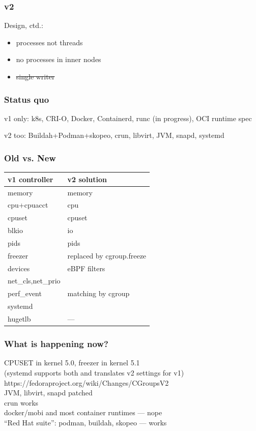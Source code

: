 \documentclass[serif]{beamer}
\begin{document}
\begin{frame}
  \frametitle{v2}

  Design, ctd.:
  \begin{itemize}
  \item processes not threads
  \item no processes in inner nodes
  \item \sout{single writer}
  \end{itemize}
\end{frame}

\begin{frame}
  \frametitle{Status quo}
  
  v1 only: k8s, CRI-O, Docker, Containerd, runc (in progress), OCI runtime spec

  \medskip

  v2 too: Buildah+Podman+skopeo, crun, libvirt, JVM, snapd, systemd
\end{frame}

\begin{frame}[fragile]
  \frametitle{Old vs. New}

  \begin{tabular}{l|l}
    v1 controller          &  v2 solution\\
    \hline
    memory                 &  memory \\
    cpu+cpuacct            &  cpu    \\
    cpuset                 &  cpuset \\
    blkio                  &  io     \\
    pids                   &  pids   \\[1em]\pause
    freezer                &  replaced by cgroup.freeze\\[1em]\pause
    devices                &  eBPF filters \\[1em]\pause
    net\_cls,net\_prio     &  \\
    perf\_event            &  matching by cgroup\\
    systemd                &  \\[1em]\pause
    hugetlb                &  —
  \end{tabular}
\end{frame}

\begin{frame}
  \frametitle{What is happening now?}

  CPUSET in kernel 5.0, freezer in kernel 5.1\\\pause
  (systemd supports both and translates v2 settings for v1)\\\pause
  https://fedoraproject.org/wiki/Changes/CGroupsV2\\\pause
  JVM, libvirt, snapd patched\\\pause
  crun works\\
  docker/mobi and most container runtimes — nope\\\pause
  ``Red Hat suite'': podman, buildah, skopeo — works
\end{frame}
\end{document}
